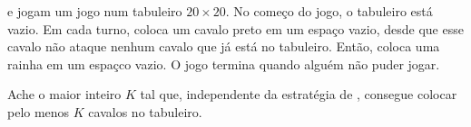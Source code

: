  e  jogam um jogo num tabuleiro $20 \times 20$. No começo do jogo, o tabuleiro está vazio. Em cada turno,  coloca um cavalo preto em um espaço vazio, desde que esse cavalo não ataque nenhum cavalo que já está no tabuleiro. Então,  coloca uma rainha em um espaçco vazio. O jogo termina quando alguém não puder jogar.

Ache o maior inteiro $K$ tal que, independente da estratégia de ,  consegue colocar pelo menos $K$ cavalos no tabuleiro.
